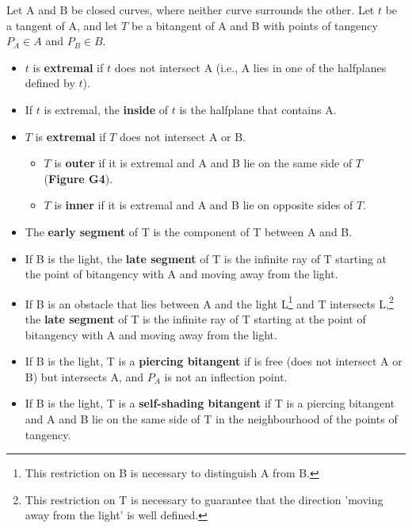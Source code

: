\documentclass[9pt]{article}
\begin{document}
\begin{defn2}
\label{defn:outer}
Let A and B be closed curves, where neither curve surrounds the other.
Let $t$ be a tangent of A,
and let $T$ be a bitangent of A and B with points of tangency $P_A \in A$ and 
$P_B \in B$.

\begin{itemize}
\item $t$ is {\bf extremal} if $t$ does not intersect A
	(i.e., A lies in one of the halfplanes defined by $t$).
\item If $t$ is extremal, the {\bf inside} of $t$ is
	the halfplane that contains A.
\item $T$ is {\bf extremal} if $T$ does not intersect A or B.
\begin{itemize}
\item $T$ is {\bf outer} if it is extremal and 
A and B lie on the same side of $T$ ({\bf Figure G4}).
\item $T$ is {\bf inner} if it is extremal and
A and B lie on opposite sides of $T$.
\end{itemize}
\item
The {\bf early segment} of T is the component of T between A and B.
\item 
If B is the light,
the {\bf late segment} of T is the infinite ray of T starting at
the point of bitangency with A and moving away from the light.
\item
If B is an obstacle that lies between A and the light L\footnote{This 
	restriction on B is necessary to distinguish A from B.}
and T intersects L,\footnote{This restriction on T is necessary
	to guarantee that the direction 'moving away from the light'
	is well defined.}
the {\bf late segment} of T is the infinite ray of T starting at the point
of bitangency with A and moving away from the light.
\item If B is the light,
T is a {\bf piercing bitangent} if  is free
(does not intersect A or B) but  intersects A,
and $P_A$ is not an inflection point.
\item If B is the light,
	T is a {\bf self-shading bitangent} if T is a piercing bitangent
	and A and B lie on the same side of T in the neighbourhood of 
	the points of tangency.
\end{itemize}
\end{defn2}
\end{document}
